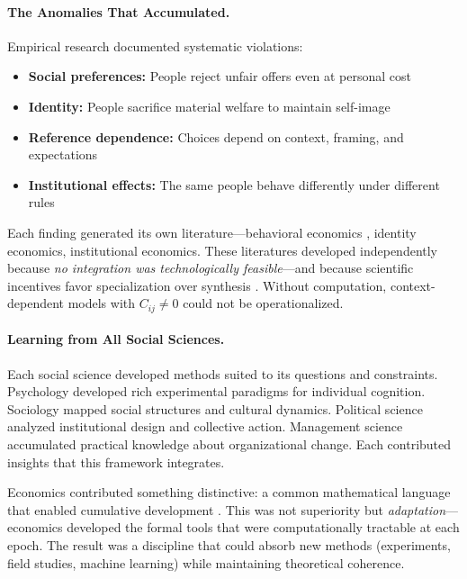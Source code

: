 \paragraph{The Anomalies That Accumulated.}
Empirical research documented systematic violations:
\begin{itemize}
  \item \textbf{Social preferences:} People reject unfair offers even at personal cost \citep{guth1982,fehrschmidt}
  \item \textbf{Identity:} People sacrifice material welfare to maintain self-image \citep{akerlofkranton,benaboutirole}
  \item \textbf{Reference dependence:} Choices depend on context, framing, and expectations \citep{kahnemantversky1979}
  \item \textbf{Institutional effects:} The same people behave differently under different rules \citep{north1990institutions, acemoglu}
\end{itemize}

Each finding generated its own literature---behavioral economics \citep{camloewrabin}, identity economics, institutional economics. These literatures developed independently because \emph{no integration was technologically feasible}---and because scientific incentives favor specialization over synthesis \citep{smaldino2016natural,kuhn1962structure}. Without computation, context-dependent models with $C_{ij} \neq 0$ could not be operationalized.

\paragraph{Learning from All Social Sciences.}
Each social science developed methods suited to its questions and constraints. Psychology developed rich experimental paradigms for individual cognition. Sociology mapped social structures and cultural dynamics. Political science analyzed institutional design and collective action. Management science accumulated practical knowledge about organizational change. Each contributed insights that this framework integrates.

Economics contributed something distinctive: a common mathematical language that enabled cumulative development \citep{fourcade2009economists,fourcade2015}. This was not superiority but \emph{adaptation}---economics developed the formal tools that were computationally tractable at each epoch. The result was a discipline that could absorb new methods (experiments, field studies, machine learning) while maintaining theoretical coherence.

